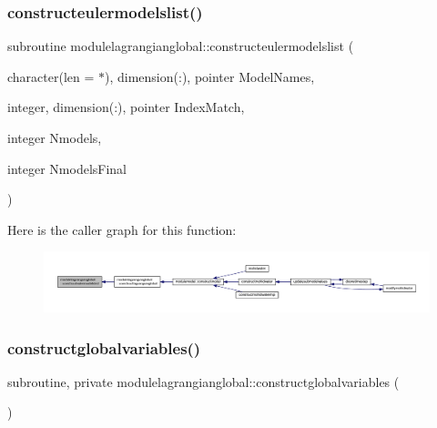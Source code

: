 \subsubsection{\texorpdfstring{constructeulermodelslist()}{constructeulermodelslist()}}
{\footnotesize\ttfamily subroutine modulelagrangianglobal\+::constructeulermodelslist (\begin{DoxyParamCaption}\item[{character(len = $\ast$), dimension(\+:), pointer}]{Model\+Names,  }\item[{integer, dimension(\+:), pointer}]{Index\+Match,  }\item[{integer}]{Nmodels,  }\item[{integer}]{Nmodels\+Final }\end{DoxyParamCaption})\hspace{0.3cm}{\ttfamily [private]}}

Here is the caller graph for this function\+:\nopagebreak
\begin{figure}[H]
\begin{center}
\leavevmode
\includegraphics[width=350pt]{namespacemodulelagrangianglobal_a409542d48e7b2b20840dc3545d1a34f0_icgraph}
\end{center}
\end{figure}
\mbox{\label{namespacemodulelagrangianglobal_ac07ce699fa5190e37b220b344450ba80}} 
\subsubsection{\texorpdfstring{constructglobalvariables()}{constructglobalvariables()}}
{\footnotesize\ttfamily subroutine, private modulelagrangianglobal\+::constructglobalvariables (\begin{DoxyParamCaption}{ }\end{DoxyParamCaption})\hspace{0.3cm}{\ttfamily [private]}}


